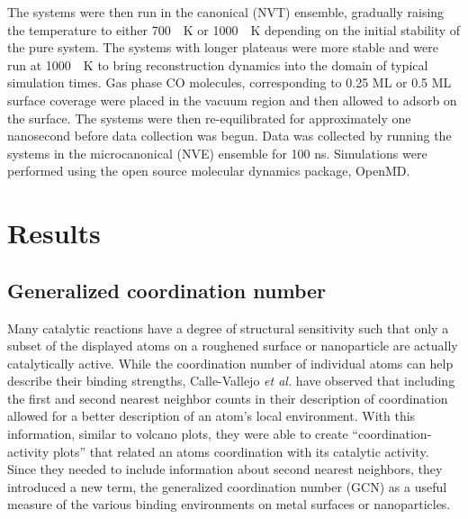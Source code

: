 The systems were then run in the canonical (NVT) ensemble, gradually raising
the temperature to either 700\ ~K or 1000\ ~K depending on the initial
stability of the pure system.  The systems with longer plateaus were more
stable and were run at 1000\ ~K to bring reconstruction dynamics into the
domain of typical simulation times.  Gas phase CO molecules, corresponding to
0.25 ML or 0.5 ML surface coverage were placed in the vacuum region and then
allowed to adsorb on the surface. The systems were then re-equilibrated for
approximately one nanosecond before data collection was begun.  Data was
collected by running the systems in the microcanonical (NVE) ensemble for 100
ns.  Simulations were performed using the open source molecular dynamics
package, OpenMD.\citep{Fennell:2006xq, Meineke:2005pt, openmd} 

\section{Results}


\subsection{Generalized coordination number}
Many catalytic reactions have a degree of structural sensitivity such that only
a subset of the displayed atoms on a roughened surface or nanoparticle are
actually catalytically active. While the coordination number of individual
atoms can help describe their binding strengths, Calle-Vallejo {\it et al.}
have observed that including the first and second nearest neighbor counts in
their description of coordination allowed for a better description of an atom's
local environment.\citep{Calle-Vallejo:2015qq} With this information, similar to
volcano plots, they were able to create ``coordination-activity plots'' that
related an atoms coordination with its catalytic activity. Since they needed to
include information about second nearest neighbors, they introduced a new term,
the generalized coordination number (GCN) as a useful measure of the various
binding environments on metal surfaces or nanoparticles. 


